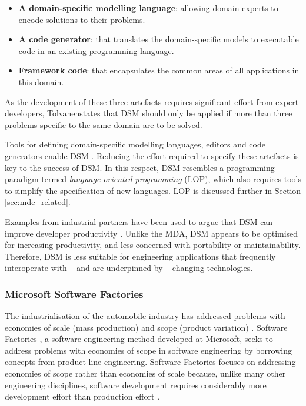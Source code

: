 \begin{itemize}
 \item \textbf{A domain-specific modelling language}: allowing domain experts to encode solutions to their problems.
 \item \textbf{A code generator}: that translates the domain-specific models to executable code in an existing programming language.
 \item \textbf{Framework code}: that encapsulates the common areas of all applications in this domain.
\end{itemize}

As the development of these three artefacts requires significant effort from expert developers, Tolvanen\footnotemark[\value{footnote}] states that DSM should only be applied if more than three problems specific to the same domain are to be solved.

Tools for defining domain-specific modelling languages, editors and code generators enable DSM \cite{kelly08dsm}. Reducing the effort required to specify these artefacts is key to the success of DSM. In this respect, DSM resembles a programming paradigm termed \textit{language-oriented programming} (LOP), which also requires tools to simplify the specification of new languages. LOP is discussed further in Section \ref{sec:mde_related}.

Examples from industrial partners have been used to argue that DSM can improve developer productivity \cite{kelly08dsm}. Unlike the MDA, DSM appears to be optimised for increasing productivity, and less concerned with portability or maintainability. Therefore, DSM is less suitable for engineering applications that frequently interoperate with -- and are underpinned by -- changing technologies.

\subsubsection{Microsoft Software Factories}
The industrialisation of the automobile industry has addressed problems with economies of scale (mass production) and scope (product variation) \cite[pg159]{greenfield04software}. Software Factories \cite{greenfield04software}, a software engineering method developed at Microsoft, seeks to address problems with economies of scope in software engineering by borrowing concepts from product-line engineering. Software Factories focuses on addressing economies of scope rather than economies of scale because, unlike many other engineering disciplines, software development requires considerably more development effort than production effort \cite{greenfield04software}.

